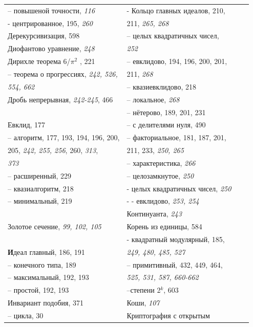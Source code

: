 \documentclass{mai_book}
\begin{document}
{	\newpage
	
	\begin{tabular}{llcc}
	-- повышеной точности, \emph{116} & - Кольцо главных идеалов, 210, \\
	- центрированное, 195, \emph{260} & 211, {\itshape 265, 268} \\
	Дерекурсивизация, 598 & 
-- целых квадратичных чисел, \\
Диофантово уравнение, \emph{248} & \emph{252} \\
	Дирихле теорема 6/{\large$\pi^{2}$} , 221 & -- евклидово, 194, 196, 200, 201, \\
	-- теорема о прогрессиях, {\itshape 242, 526,} & 211, \emph{268} \\
	{\itshape 554, 662} & -- квазиевклидово, 218 \\
		Дробь непрерывная, \emph{242-245}, 466 & -- локальное, \emph{268} \\
			& -- нётерово, 189, 201, 231 \\
		Евклид, 177 & -- с делителями нуля, 490 \\
	-- алгоритм, 177, 193, 194, 196, 200, & -- факториальное, 181, 187, 201, \\
		205, \emph{242, 255, 256}, 260, \emph{313}, & 
211, 233, \emph{250, 265} \\
		\emph{373} & -- характеристика, \emph{266} \\
		-- расширенный, 229 & -- целозамкнутое, \emph{250} \\
		-- квазиалгоритм, 218 & - целых квадратичных чисел, \emph{250}\\
		-- минимальный, 219 & - - евклидово, {\itshape 253, 254} \\
		& Континуанта, \emph{243}\\
		Золотое сечение, {\itshape 99, 102, 105} & Корень из единицы, 584 \\
		& - квадратный модулярный, 185,\\
		\textbf{И}деал главный, 186, 191 & {\itshape 249, 480, 485, 527}\\
		-- конечного типа, 189 & -- примитивный, 432, 449, 464,\\
		-- максимальный, 192, 193 & {\itshape 525, 531, 587, 660-662}\\
		-- простой, 192, 193 & --степени 2$^{k}$, 603 \\
		Инвариант подобия, 371 & Коши, \emph{107}\\
		-- цикла, 30 & Криптография с открытым \\

\end{tabular}}
\end{document}
